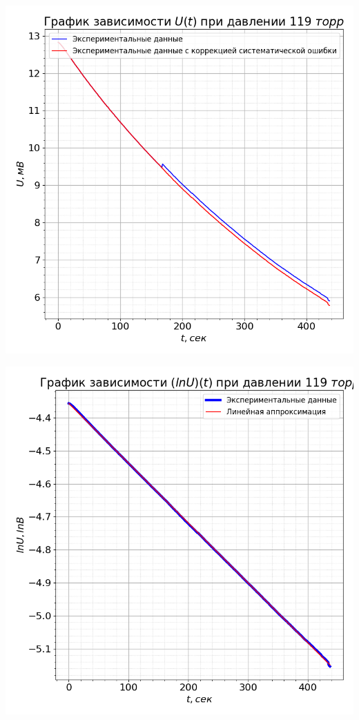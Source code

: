 \documentclass[a4paper, 12pt]{article}
\begin{document}
        \begin{minipage}{0.47\textwidth}
            \includegraphics[width=1\linewidth]{graphs/raw119.png}
        \end{minipage}
        \begin{minipage}{0.47\textwidth}
            \includegraphics[width=1\linewidth]{graphs/log119.png}
        \end{minipage}
\end{document}
